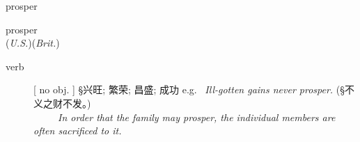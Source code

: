 \documentclass[avery5372, grid]{flashcards}
\begin{document}
\begin{flashcard}[{\B  7 Habits} {\S 词汇}]{\Huge prosper}
	\begin{center}
		{\LARGE pros\textbullet per}\\
		(\textit{U.S.})\hspace{0.25cm}(\textit{Brit.})
	\end{center}
	\begin{description}
		
		\item[verb] %
			[ no obj. ] {\S 兴旺; 繁荣; 昌盛; 成功} e.g. \textbullet\ \textit{Ill-gotten gains never prosper.} ({\S 不义之财不发。})\\
			\ \ \ \ \textbullet\ \textit{In order that the family may prosper, the individual members are often sacrificed to it.}
			
			
		
			
			
			
		

\end{description}
\end{flashcard}
\end{document}
